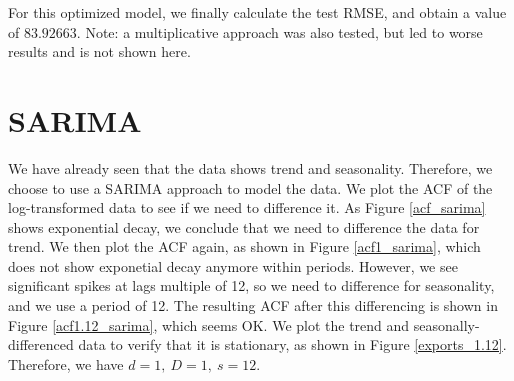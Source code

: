\documentclass[]{article}
\begin{document}
For this optimized model, we finally calculate the test RMSE, and obtain a value of $83.92663$. Note: a multiplicative approach was also tested, but led to worse results and is not shown here.

\newpage
\section{SARIMA}
We have already seen that the data shows trend and seasonality. Therefore, we choose to use a SARIMA approach to model the data. We plot the ACF of the log-transformed data to see if we need to difference it. As Figure \ref{acf_sarima} shows exponential decay, we conclude that we need to difference the data for trend. We then plot the ACF again, as shown in Figure \ref{acf1_sarima}, which does not show exponetial decay anymore within periods. However, we see significant spikes at lags multiple of 12, so we need to difference for seasonality, and we use a period of 12. The resulting ACF after this differencing is shown in Figure \ref{acf1.12_sarima}, which seems OK. We plot the trend and seasonally-differenced data to verify that it is stationary, as shown in Figure \ref{exports_1.12}. Therefore, we have $d=1,\ D=1,\ s=12$.
\end{document}
